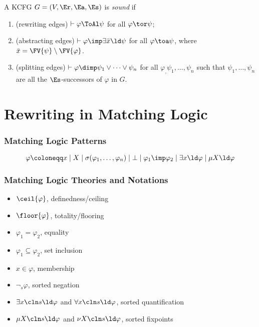 \begin{frame}
\begin{definition}
A KCFG $G = (V, \Er, \Ea, \Es)$ is \emph{sound} if
\begin{enumerate}
\item (rewriting edges) $\vdash \varphi \ToAl \psi$ for all $\varphi \tor \psi$;
\item (abstracting edges) 
   $\vdash \varphi \imp \exists \bar{x} \ld \psi$ for all $\varphi \toa \psi$,
   where $\bar{x} = \FV{\psi} \setminus \FV{\varphi}$.
\item (splitting edges) $\vdash \varphi \dimp \psi_1 \lor \dots \lor \psi_n$
 for all $\varphi_,\psi_1,\dots,\psi_n$ such that
 $\psi_1,\dots,\psi_n$ are all the $\Es$-successors of $\varphi$ in $G$.
\end{enumerate}
\end{definition}
\end{frame}

\begin{frame}
\begin{example}

\end{example}
\end{frame}



\section{Rewriting in Matching Logic}

\begin{frame}
\frametitle{Matching Logic Patterns}
\[
\varphi \coloneqq x \mid X \mid \sigma(\varphi_1,\dots,\varphi_n)
\mid \bot \mid \varphi_1 \imp \varphi_2 \mid \exists x \ld \varphi
\mid \mu X \ld \varphi
\]
\end{frame}

\begin{frame}
\frametitle{Matching Logic Theories and Notations}
\begin{itemize}
\item $\ceil{\varphi}$, definedness/ceiling
\item $\floor{\varphi}$, totality/flooring
\item $\varphi_1 = \varphi_2$, equality
\item $\varphi_1 \subseteq \varphi_2$, set inclusion
\item $x \in \varphi$, membership
\item $\neg_s \varphi$, sorted negation
\item $\exists x \cln s \ld \varphi$ and
      $\forall x \cln s \ld \varphi$, sorted quantification
\item $\mu X \cln s \ld \varphi$ and $\nu X \cln s \ld \varphi$,
      sorted fixpoints
\end{itemize}
\end{frame}

